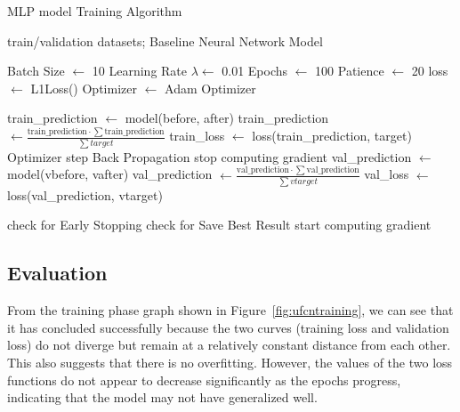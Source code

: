 \begin{algorithm}[H]
	\caption{MLP model Training Algorithm}\label{alg:ufcntraining}
	\begin{algorithmic}
		\Require train/validation datasets; Baseline Neural Network Model

		\State Batch Size $\gets$ 10
		\State Learning Rate $\lambda \gets$ 0.01
		\State Epochs $\gets$ 100
		\State Patience $\gets$ 20
		\State loss $\gets$ L1Loss()
		\State Optimizer $\gets$ Adam Optimizer
		\State

		\State train\_prediction $\gets$ model(before, after) 
		\State train\_prediction $\gets \frac{\text{train\_prediction} \cdot \sum\text{train\_prediction}}{\sum target}$ 
		\State train\_loss $\gets$ loss(train\_prediction, target)
		\State Optimizer step
		\State Back Propagation
		\EndFor
		\State stop computing gradient
		\State val\_prediction $\gets$ model(vbefore, vafter) 
		\State val\_prediction $\gets \frac{\text{val\_prediction} \cdot \sum\text{val\_prediction}}{\sum vtarget}$ 
		\State val\_loss $\gets$ loss(val\_prediction, vtarget)
		\EndFor

		\State check for Early Stopping
		\State check for Save Best Result
		\State start computing gradient
		\EndFor
	\end{algorithmic}
\end{algorithm}

\subsection{Evaluation}
From the training phase graph shown in Figure~\ref{fig:ufcntraining},
we can see that it has concluded successfully because the two curves
(training loss and validation loss) do not diverge but remain at a
relatively constant distance from each other.
This also suggests that there is no overfitting.
However, the values of the two loss functions do not appear to decrease
significantly as the epochs progress, indicating that the model may
not have generalized well.


